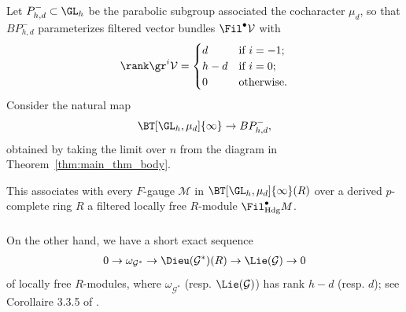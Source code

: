 \documentclass[10pt]{amsart}
\begin{document}
\subsubsection{}
Let $P^-_{h,d}\subset \GL_h$ be the parabolic subgroup associated the cocharacter $\mu_d$, so that $BP^-_{h,d}$ parameterizes filtered vector bundles $\Fil^\bullet \mathcal{V}$ with 
\[
\rank\gr^{i}\mathcal{V} = \begin{cases}
d&\text{if $i=-1$;}\\
h-d&\text{if $i=0$;}\\
0&\text{otherwise}.
\end{cases}
\]
Consider the natural map
\[
\BT[\GL_h,\mu_d]{\infty}\to BP^-_{h,d},
\]
obtained by taking the limit over $n$ from the diagram in Theorem~\ref{thm:main_thm_body}. 

This associates with every $F$-gauge $\mathcal{M}$ in $\BT[\GL_h,\mu_d]{\infty}(R)$ over a derived $p$-complete ring $R$ a filtered locally free $R$-module $\Fil^\bullet_{\mathrm{Hdg}}M$. 


\subsubsection{}
On the other hand,  we have a short exact sequence
\begin{align}
\label{eqn:bbm_ses}
0\to \omega_{\mathcal{G}^*}\to \Dieu(\mathcal{G}^*)(R)\to \Lie(\mathcal{G})\to 0
\end{align}
of locally free $R$-modules, where $\omega_{\mathcal{G}^*}$ (resp. $\Lie(\mathcal{G})$) has rank $h-d$ (resp. $d$); see Corollaire 3.3.5 of \cite{bbm:cris_ii}.
\end{document}
